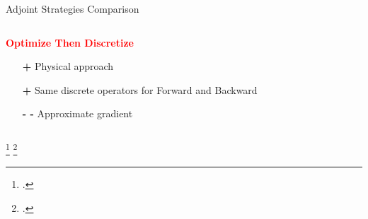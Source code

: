 
\begin{frame}{Adjoint Strategies Comparison}
  \begin{columns}
    \begin{column}[t]{0.5\textwidth}
      \textbf{\textcolor{red}{Optimize Then Discretize}}
      \vspace{0.5cm}
      \begin{itemize}
      \item[\textcolor{\mygreen}{\textbf{+}}] Physical approach
      \item[\textcolor{\mygreen}{\textbf{+}}] Same discrete operators for Forward and Backward
      \item[\textbf{- -}] Approximate gradient \footnotemark
      \end{itemize}
      \vspace{0.5cm}
    \end{column}\vrule \hfill
    \begin{column}[t]{0.5\textwidth}
    \end{column}
  \end{columns}
   \footcitetext{gunzburger2002perspectives}
   \footcitetext{sei1995note}
\end{frame}





